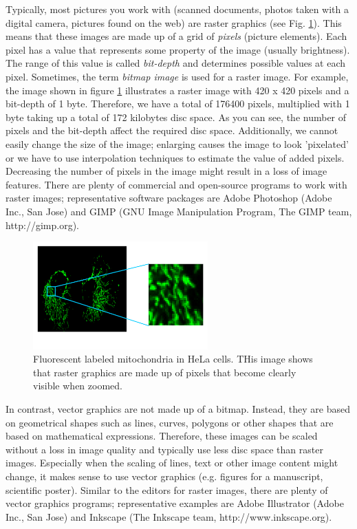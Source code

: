 Typically, most pictures you work with (scanned documents, photos taken with a digital camera, pictures found on the web) are raster graphics (see Fig. \ref{fig:bitmap-graphics}). This means that these images are made up of a grid of \emph{pixels} (picture elements). Each pixel has a value that represents some property of the image (usually brightness). The range of this value is called \emph{bit-depth} and determines possible values at each pixel. Sometimes, the term \emph{bitmap image} is used for a raster image. For example, the image shown in figure \ref{fig:bitmap-graphics} illustrates a raster image with 420 x 420 pixels and a bit-depth of 1 byte. Therefore, we have a total of 176400 pixels, multiplied with 1 byte taking up a total of 172 kilobytes disc space. As you can see, the number of pixels and the bit-depth affect the required disc space. Additionally, we cannot easily change the size of the image; enlarging causes the image to look 'pixelated' or we have to use interpolation techniques to estimate the value of added pixels. Decreasing the number of pixels in the image might result in a loss of image features. There are plenty of commercial and open-source programs to work with raster images; representative software packages are Adobe Photoshop (Adobe Inc., San Jose) and GIMP (GNU Image Manipulation Program, The GIMP team, http://gimp.org).

\begin{figure}[!ht]
	\centering
		\includegraphics[width=0.60\textwidth]{mod1-publishing/figures/bitmap-graphics.png}
	\caption{Fluorescent labeled mitochondria in HeLa cells. THis image shows that raster graphics are made up of pixels that become clearly visible when zoomed.}
	\label{fig:bitmap-graphics}
\end{figure}


In contrast, vector graphics are not made up of a bitmap. Instead, they are based on geometrical shapes such as lines, curves, polygons or other shapes that are based on mathematical expressions. Therefore, these images can be scaled without a loss in image quality and typically use less disc space than raster images. Especially when the scaling of lines, text or other image content might change, it makes sense to use vector graphics (e.g. figures for a manuscript, scientific poster). Similar to the editors for raster images, there are plenty of vector graphics programs; representative examples are Adobe Illustrator (Adobe Inc., San Jose) and Inkscape (The Inkscape team, http://www.inkscape.org).

